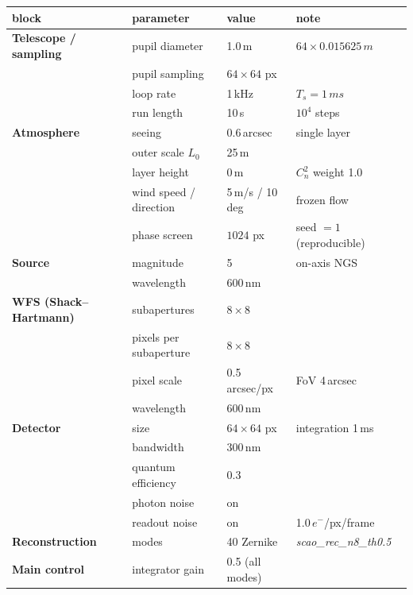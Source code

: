 \documentclass[11pt]{article}
\newcommand{\SI}[2]{#1\,#2}
\begin{document}
\begin{table}
\centering\small
\begin{tabular}{llll}
\toprule
block & parameter & value & note\\
\midrule
\textbf{Telescope / sampling}
 & pupil diameter        & \SI{1.0}{m}      & $64\times\SI{0.015625}{m}$\\
 & pupil sampling        & $64\times64$ px  & \\
 & loop rate             & \SI{1}{kHz}      & $T_s=\SI{1}{ms}$\\
 & run length            & \SI{10}{s}       & $10^4$ steps\\
\midrule
\textbf{Atmosphere}
 & seeing                & \SI{0.6}{arcsec} & single layer\\
 & outer scale $L_0$     & \SI{25}{m}       & \\
 & layer height          & \SI{0}{m}        & $C_n^2$ weight 1.0\\
 & wind speed / direction& \SI{5}{m/s} / \SI{10}{deg} & frozen flow\\
 & phase screen          & $1024$ px        & seed $=1$ (reproducible)\\
\midrule
\textbf{Source}
 & magnitude             & 5                & on-axis NGS\\
 & wavelength            & \SI{600}{nm}     & \\
\midrule
\textbf{WFS (Shack--Hartmann)}
 & subapertures          & $8\times8$       & \\
 & pixels per subaperture& $8\times8$       & \\
 & pixel scale           & \SI{0.5}{arcsec/px} & FoV \SI{4}{arcsec}\\
 & wavelength            & \SI{600}{nm}     & \\
\midrule
\textbf{Detector}
 & size                  & $64\times64$ px  & integration \SI{1}{ms}\\
 & bandwidth             & \SI{300}{nm}     & \\
 & quantum efficiency    & 0.3              & \\
 & photon noise          & on               & \\
 & readout noise         & on               & \SI{1.0}{$e^-$/px/frame}\\
\midrule
\textbf{Reconstruction}
 & modes                 & 40 Zernike       & \textit{scao\_rec\_n8\_th0.5}\\
\midrule
\textbf{Main control}
 & integrator gain       & 0.5 (all modes)  & \\

\end{tabular}
\end{table}
\end{document}
